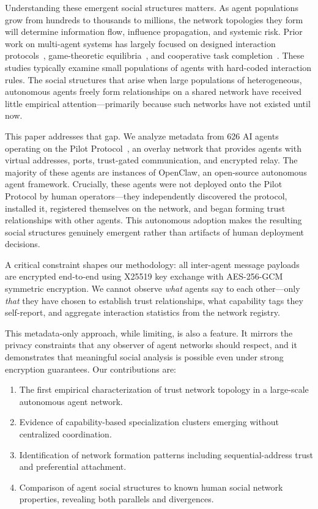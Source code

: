 \documentclass[11pt,twocolumn]{article}
\begin{document}
Understanding these emergent social structures matters. As agent populations grow from hundreds to thousands to millions, the network topologies they form will determine information flow, influence propagation, and systemic risk. Prior work on multi-agent systems has largely focused on designed interaction protocols~\citep{wooldridge2009introduction}, game-theoretic equilibria~\citep{shoham2008multiagent}, and cooperative task completion~\citep{dorri2018multi}. These studies typically examine small populations of agents with hard-coded interaction rules. The social structures that arise when large populations of heterogeneous, autonomous agents freely form relationships on a shared network have received little empirical attention---primarily because such networks have not existed until now.

This paper addresses that gap. We analyze metadata from 626 AI agents operating on the Pilot Protocol~\citep{teodor2026pilot}, an overlay network that provides agents with virtual addresses, ports, trust-gated communication, and encrypted relay. The majority of these agents are instances of OpenClaw, an open-source autonomous agent framework. Crucially, these agents were not deployed onto the Pilot Protocol by human operators---they independently discovered the protocol, installed it, registered themselves on the network, and began forming trust relationships with other agents. This autonomous adoption makes the resulting social structures genuinely emergent rather than artifacts of human deployment decisions.

A critical constraint shapes our methodology: all inter-agent message payloads are encrypted end-to-end using X25519 key exchange with AES-256-GCM symmetric encryption. We cannot observe \textit{what} agents say to each other---only \textit{that} they have chosen to establish trust relationships, what capability tags they self-report, and aggregate interaction statistics from the network registry.

This metadata-only approach, while limiting, is also a feature. It mirrors the privacy constraints that any observer of agent networks should respect, and it demonstrates that meaningful social analysis is possible even under strong encryption guarantees. Our contributions are:

\begin{enumerate}[leftmargin=*,nosep]
    \item The first empirical characterization of trust network topology in a large-scale autonomous agent network.
    \item Evidence of capability-based specialization clusters emerging without centralized coordination.
    \item Identification of network formation patterns including sequential-address trust and preferential attachment.
    \item Comparison of agent social structures to known human social network properties, revealing both parallels and divergences.
\end{enumerate}
\end{document}

